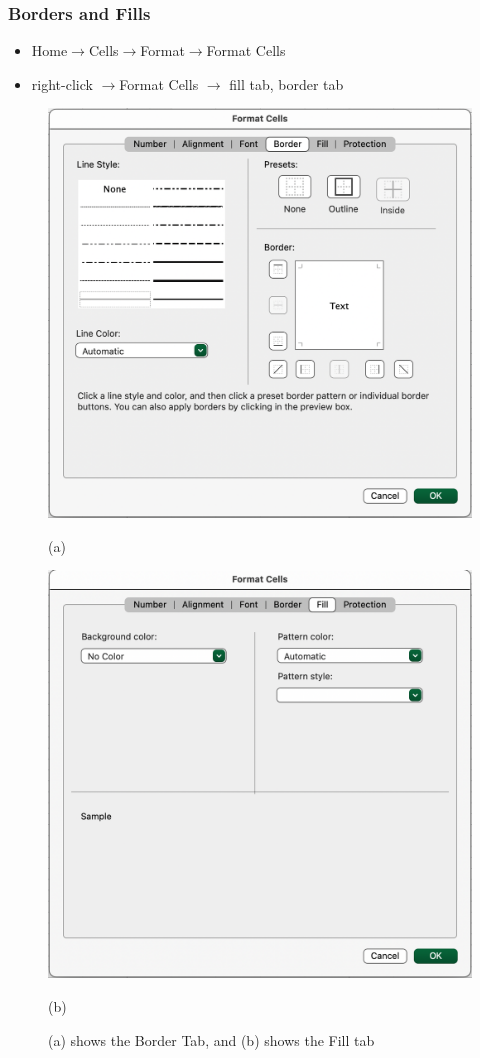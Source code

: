 \documentclass[12pt]{beamer}
\begin{document}
	\begin{frame}
		\frametitle{Borders and Fills}
		\begin{itemize}
			\item Home$\rightarrow$Cells$\rightarrow$Format$\rightarrow$Format Cells \item right-click $\rightarrow$Format Cells $\rightarrow$ fill tab, border tab
		\end{itemize}
		\begin{figure}[htb]
			\begin{minipage}[t]{0.49\linewidth}\centering
				\includegraphics[width=0.75\linewidth]{cellformat_border_tab.png}
				\medskip
				\centerline{(a)}
			\end{minipage}\hfill
			\begin{minipage}[t]{0.5\linewidth}\centering
				\includegraphics[width=0.75\linewidth]{cellformat_fill_tab.png}
				\medskip
				\centerline{(b)}
			\end{minipage}
			\caption{(a) shows the Border Tab, and (b) shows the Fill tab}
		\end{figure}
	\end{frame}
\end{document}
